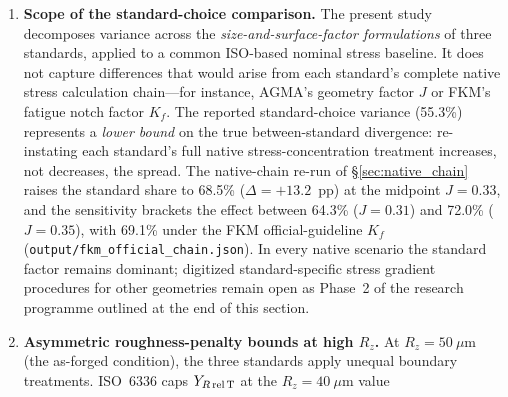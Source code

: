 \documentclass[twocolumn,12pt,a4paper]{article}
\begin{document}
\begin{enumerate}
        This direction of change has a geometric explanation: for
        $z_1=20$, $m_n=3$~mm, $20^\circ$~PA, no profile shift, ISO's
        $Y_{Sa}=1.55$, AGMA's $1/J \approx 3.03$, and FKM's
        $K_f \approx 1.84$: the AGMA multiplier matches ISO to within
        $\sim$1\% ($(1/J)/(Y_{Fa}Y_\varepsilon) \approx 1.57$ vs.\
        $Y_{Sa}=1.55$), while the FKM multiplier is $\sim$19\% higher
        ($K_f/Y_{Sa} \approx 1.19$). The lower-bound interpretation is
        therefore strengthened for this gear: the midpoint native
        scenario raises the standard's share from 55.3\% to 68.5\%,
        while the AGMA $J$-sensitivity brackets the effect between
        64.3\% ($J=0.31$) and 72.0\% ($J=0.35$), and the Neuber
        $K_f$ alternative gives 65.4\%. For other gear geometries (low tooth
        counts, high helix angles), this geometric coincidence may not
        hold, and a geometry-specific check is recommended.
  \item \textbf{Scope of the standard-choice comparison.} The present study
        decomposes variance across the \emph{size-and-surface-factor
        formulations} of three standards, applied to a common ISO-based
        nominal stress baseline. It does not capture differences that would
        arise from each standard's complete native stress calculation
        chain---for instance, AGMA's geometry factor $J$ or FKM's fatigue
        notch factor $K_f$. The reported standard-choice variance (55.3\%)
        represents a \emph{lower bound} on the true
        between-standard divergence: re-instating each standard's full native
        stress-concentration treatment increases, not decreases,
        the spread. The native-chain re-run of \S\ref{sec:native_chain}
        raises the standard share to 68.5\% ($\Delta = +13.2$~pp) at the
        midpoint $J=0.33$, and the sensitivity brackets the effect
        between 64.3\% ($J=0.31$) and 72.0\% ($J=0.35$), with 69.1\%
        under the FKM official-guideline $K_f$
        (\texttt{output/fkm\_official\_chain.json}). In every native scenario the standard
        factor remains dominant; digitized standard-specific stress
        gradient procedures for other geometries
        remain open as Phase~2 of the research programme
        outlined at the end of this section.
  \item \textbf{Asymmetric roughness-penalty bounds at high $R_z$.} At
        $R_z = 50~\mu$m (the as-forged condition), the three standards
        apply unequal boundary treatments. ISO~6336 caps
        $Y_{R\,\rm rel\,T}$ at the $R_z = 40~\mu$m value

\end{enumerate}
\end{document}
